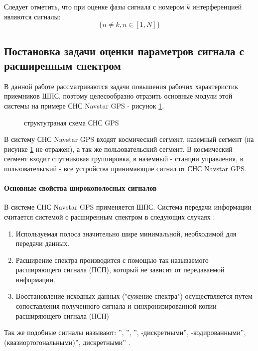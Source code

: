Следует отметить, что при оценке фазы сигнала с номером ${k}$  интерференцией являются сигналы:    .
\begin{equation}
	\{n \ne k, n \in [1,N]\}
\end{equation}

\subsection{Постановка задачи оценки параметров сигнала с расширенным спектром}
В данной работе рассматриваются задачи повышения рабочих характеристик приемников ШПС, поэтому целесообразно отразить основные модули этой системы 
на примере СНС Navstar GPS - рисунок \ref{pic:sec1_gnss_system}.
\begin{figure}[H]
	\center{}
	\caption{структутраная схема СНС GPS}
	\label{pic:sec1_gnss_system}
\end{figure}

В систему СНС Navstar GPS входят космический сегмент, наземный сегмент (на рисунке \ref{pic:sec1_gnss_system} не
отражен), а так же пользовательский сегмент. В космический сегмент входит спутниковая группировка, в 
наземный - станции управления, в пользовательский - все устройства принимающие сигнал от СНС Navstar GPS.

\paragraph{Основные свойства широкополосных сигналов}
В системе СНС Navstar GPS применяется ШПС. Система передачи информации считается системой с расширенным спектром в следующих случаях \cite{sklyar}:
\begin{enumerate}
	\item Используемая полоса значительно шире минимальной, необходимой для передачи данных.
	\item Расширение спектра производится с помощью так называемого расширяющего сигнала (ПСП),
		который не зависит от передаваемой информации.
	\item Восстановление исходных данных ("сужение спектра") осуществляется путем сопоставления полученного
		сигнала и синхронизированной копии расширяющего сигнала (ПСП)
\end{enumerate}

Так же подобные сигналы называют:
\textquotedblright,
\textquotedblright,
\textquotedblright,
-дискретными\textquotedblright,
-кодированными\textquotedblright,
 (квазиортогональными)\textquotedblright,
 дискретными\textquotedblright
\cite{gantmaher-book}.

